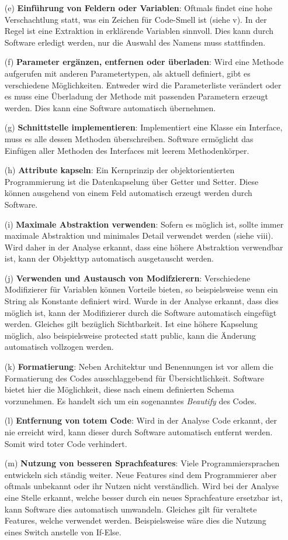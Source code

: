 \begin{itemize}
	\item[(e)] \textbf{Einführung von Feldern oder Variablen}: Oftmals findet eine hohe Verschachtlung statt, was ein Zeichen für Code-Smell ist (siehe v). In der Regel ist eine Extraktion in erklärende Variablen sinnvoll. Dies kann durch Software erledigt werden, nur die Auswahl des Namens muss stattfinden.
	\item[(f)] \textbf{Parameter ergänzen, entfernen oder überladen}: Wird eine Methode aufgerufen mit anderen Parametertypen, als aktuell definiert, gibt es verschiedene Möglichkeiten. Entweder wird die Parameterliste verändert oder es muss eine Überladung der Methode mit passenden Parametern erzeugt werden. Dies kann eine Software automatisch übernehmen.
	\item[(g)] \textbf{Schnittstelle implementieren}: Implementiert eine Klasse ein Interface, muss es alle dessen Methoden überschreiben. Software ermöglicht das Einfügen aller Methoden des Interfaces mit leerem Methodenkörper. 
	\item[(h)] \textbf{Attribute kapseln}: Ein Kernprinzip der objektorientierten Programmierung ist die Datenkapselung über Getter und Setter. Diese können ausgehend von einem Feld automatisch erzeugt werden durch Software.
	\item[(i)] \textbf{Maximale Abstraktion verwenden}: Sofern es möglich ist, sollte immer maximale Abstraktion und minimales Detail verwendet werden (siehe viii). Wird daher in der Analyse erkannt, dass eine höhere Abstraktion verwendbar ist, kann der Objekttyp automatisch ausgetauscht werden.
	\item[(j)] \textbf{Verwenden und Austausch von Modifzierern}: Verschiedene Modifizierer für Variablen können Vorteile bieten, so beispielsweise wenn ein String als Konstante definiert wird. Wurde in der Analyse erkannt, dass dies möglich ist, kann der Modifizierer durch die Software automatisch eingefügt werden. Gleiches gilt bezüglich Sichtbarkeit. Ist eine höhere Kapselung möglich, also beispielsweise protected statt public, kann die Änderung automatisch vollzogen werden.
	\item[(k)] \textbf{Formatierung}: Neben Architektur und Benennungen ist vor allem die Formatierung des Codes ausschlaggebend für Übersichtlichkeit. Software bietet hier die Möglichkeit, diese nach einem definierten Schema vorzunehmen. Es handelt sich um ein sogenanntes \textit{Beautify} des Codes.
	\item[(l)] \textbf{Entfernung von totem Code}: Wird in der Analyse Code erkannt, der nie erreicht wird, kann dieser durch Software automatisch entfernt werden. Somit wird toter Code verhindert.
	\item[(m)] \textbf{Nutzung von besseren Sprachfeatures}: Viele Programmiersprachen entwickeln sich ständig weiter. Neue Features sind dem Programmierer aber oftmals unbekannt oder ihr Nutzen nicht verständlich. Wird bei der Analyse eine Stelle erkannt, welche besser durch ein neues Sprachfeature ersetzbar ist, kann Software dies automatisch umwandeln. Gleiches gilt für veraltete Features, welche verwendet werden. Beispielsweise wäre dies die Nutzung eines Switch anstelle von If-Else.
\end{itemize}
